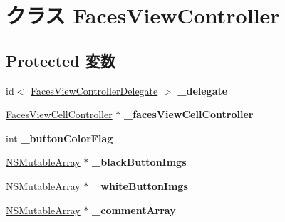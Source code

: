 \hypertarget{interface_faces_view_controller}{
\section{クラス FacesViewController}
\label{interface_faces_view_controller}
}
\subsection*{Protected 変数}
\begin{DoxyCompactItemize}
\item 
\hypertarget{interface_faces_view_controller_aa6ab651bbb205936a2b354b9f41a6ad8}{
id$<$ \hyperlink{protocol_faces_view_controller_delegate-p}{FacesViewControllerDelegate} $>$ {\bfseries \_\-delegate}}
\label{interface_faces_view_controller_aa6ab651bbb205936a2b354b9f41a6ad8}

\item 
\hypertarget{interface_faces_view_controller_a8e55af70a38e1e0e16f2b14ac33f6984}{
\hyperlink{interface_faces_view_cell_controller}{FacesViewCellController} $\ast$ {\bfseries \_\-facesViewCellController}}
\label{interface_faces_view_controller_a8e55af70a38e1e0e16f2b14ac33f6984}

\item 
\hypertarget{interface_faces_view_controller_ab58c5ecde0c1d91bc60d34a64de34fc6}{
int {\bfseries \_\-buttonColorFlag}}
\label{interface_faces_view_controller_ab58c5ecde0c1d91bc60d34a64de34fc6}

\item 
\hypertarget{interface_faces_view_controller_aa7da7392fe616ef36fcfd2110f5c8605}{
\hyperlink{class_n_s_mutable_array}{NSMutableArray} $\ast$ {\bfseries \_\-blackButtonImgs}}
\label{interface_faces_view_controller_aa7da7392fe616ef36fcfd2110f5c8605}

\item 
\hypertarget{interface_faces_view_controller_a1dbbd22d79deac4fdd45c527f4808206}{
\hyperlink{class_n_s_mutable_array}{NSMutableArray} $\ast$ {\bfseries \_\-whiteButtonImgs}}
\label{interface_faces_view_controller_a1dbbd22d79deac4fdd45c527f4808206}

\item 
\hypertarget{interface_faces_view_controller_a70ef85c180a6cfd9b468f5a0fd6495ef}{
\hyperlink{class_n_s_mutable_array}{NSMutableArray} $\ast$ {\bfseries \_\-commentArray}}
\label{interface_faces_view_controller_a70ef85c180a6cfd9b468f5a0fd6495ef}

\end{DoxyCompactItemize}
